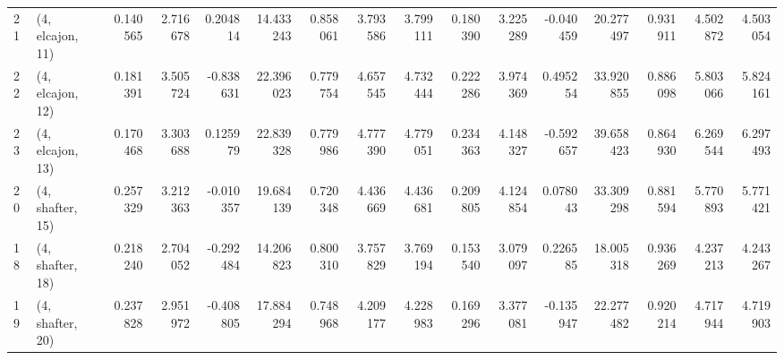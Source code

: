 \begin{tabular}{llrrrrrrrrrrrrrr}
21 &  (4, elcajon, 11) &   0.140565 &  2.716678 &  0.204814 &  14.433243 &  0.858061 &   3.793586 &  3.799111 &  0.180390 &  3.225289 & -0.040459 &   20.277497 &  0.931911 &   4.502872 &   4.503054 \\
22 &  (4, elcajon, 12) &   0.181391 &  3.505724 & -0.838631 &  22.396023 &  0.779754 &   4.657545 &  4.732444 &  0.222286 &  3.974369 &  0.495254 &   33.920855 &  0.886098 &   5.803066 &   5.824161 \\
23 &  (4, elcajon, 13) &   0.170468 &  3.303688 &  0.125979 &  22.839328 &  0.779986 &   4.777390 &  4.779051 &  0.234363 &  4.148327 & -0.592657 &   39.658423 &  0.864930 &   6.269544 &   6.297493 \\
20 &  (4, shafter, 15) &   0.257329 &  3.212363 & -0.010357 &  19.684139 &  0.720348 &   4.436669 &  4.436681 &  0.209805 &  4.124854 &  0.078043 &   33.309298 &  0.881594 &   5.770893 &   5.771421 \\
18 &  (4, shafter, 18) &   0.218240 &  2.704052 & -0.292484 &  14.206823 &  0.800310 &   3.757829 &  3.769194 &  0.153540 &  3.079097 &  0.226585 &   18.005318 &  0.936269 &   4.237213 &   4.243267 \\
19 &  (4, shafter, 20) &   0.237828 &  2.951972 & -0.408805 &  17.884294 &  0.748968 &   4.209177 &  4.228983 &  0.169296 &  3.377081 & -0.135947 &   22.277482 &  0.920214 &   4.717944 &   4.719903 \\
\bottomrule
\end{tabular}
